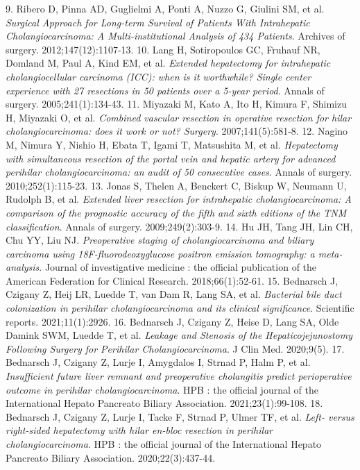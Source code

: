 \documentclass[12pt]{article}
\begin{document}
\begin{thebibliography}{22}
9.	Ribero D, Pinna AD, Guglielmi A, Ponti A, Nuzzo G, Giulini SM, et al. \textit{Surgical Approach for Long-term Survival of Patients With Intrahepatic Cholangiocarcinoma: A Multi-institutional Analysis of 434 Patients}. Archives of surgery. 2012;147(12):1107-13.
10.	Lang H, Sotiropoulos GC, Fruhauf NR, Domland M, Paul A, Kind EM, et al. \textit{Extended hepatectomy for intrahepatic cholangiocellular carcinoma (ICC): when is it worthwhile? Single center experience with 27 resections in 50 patients over a 5-year period}. Annals of surgery. 2005;241(1):134-43.
11.	Miyazaki M, Kato A, Ito H, Kimura F, Shimizu H, Miyazaki O, et al. \textit{Combined vascular resection in operative resection for hilar cholangiocarcinoma: does it work or not? Surgery}. 2007;141(5):581-8.
12.	Nagino M, Nimura Y, Nishio H, Ebata T, Igami T, Matsushita M, et al. \textit{Hepatectomy with simultaneous resection of the portal vein and hepatic artery for advanced perihilar cholangiocarcinoma: an audit of 50 consecutive cases}. Annals of surgery. 2010;252(1):115-23.
13.	Jonas S, Thelen A, Benckert C, Biskup W, Neumann U, Rudolph B, et al. \textit{Extended liver resection for intrahepatic cholangiocarcinoma: A comparison of the prognostic accuracy of the fifth and sixth editions of the TNM classification}. Annals of surgery. 2009;249(2):303-9.
14.	Hu JH, Tang JH, Lin CH, Chu YY, Liu NJ. \textit{Preoperative staging of cholangiocarcinoma and biliary carcinoma using 18F-fluorodeoxyglucose positron emission tomography: a meta-analysis}. Journal of investigative medicine : the official publication of the American Federation for Clinical Research. 2018;66(1):52-61.
15.	Bednarsch J, Czigany Z, Heij LR, Luedde T, van Dam R, Lang SA, et al. \textit{Bacterial bile duct colonization in perihilar cholangiocarcinoma and its clinical significance}. Scientific reports. 2021;11(1):2926.
16.	Bednarsch J, Czigany Z, Heise D, Lang SA, Olde Damink SWM, Luedde T, et al. \textit{Leakage and Stenosis of the Hepaticojejunostomy Following Surgery for Perihilar Cholangiocarcinoma}. J Clin Med. 2020;9(5).
17.	Bednarsch J, Czigany Z, Lurje I, Amygdalos I, Strnad P, Halm P, et al. \textit{Insufficient future liver remnant and preoperative cholangitis predict perioperative outcome in perihilar cholangiocarcinoma}. HPB : the official journal of the International Hepato Pancreato Biliary Association. 2021;23(1):99-108.
18.	Bednarsch J, Czigany Z, Lurje I, Tacke F, Strnad P, Ulmer TF, et al. \textit{Left- versus right-sided hepatectomy with hilar en-bloc resection in perihilar cholangiocarcinoma}. HPB : the official journal of the International Hepato Pancreato Biliary Association. 2020;22(3):437-44.

\end{thebibliography}
\end{document}
